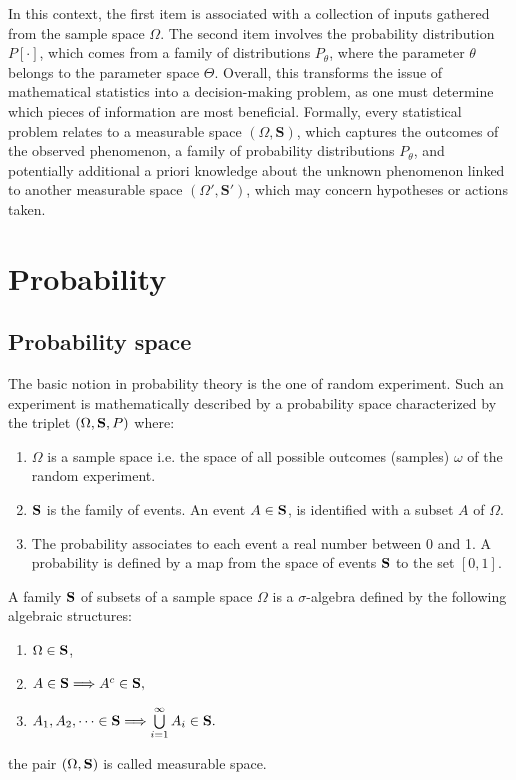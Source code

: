 In this context, the first item is associated with a collection of inputs gathered from the sample space $\Omega$. The second item involves the probability distribution $P[\cdot]$, which comes from a family of distributions ${P_{\theta}}$, where the parameter $\theta$ belongs to the parameter space $\Theta$. 
Overall, this transforms the issue of mathematical statistics into a decision-making problem, as one must determine which pieces of information are most beneficial. Formally, every statistical problem relates to a measurable space $(\Omega, \mathbf{S})$, which captures the outcomes of the observed phenomenon, a family of probability distributions ${P_{\theta}}$, and potentially additional a priori knowledge about the unknown phenomenon linked to another measurable space $(\Omega', \mathbf{S'})$, which may concern hypotheses or actions taken.

\section{Probability }\label{sec:proba}
\subsection{Probability space }
The basic notion in probability theory is the one of random experiment.
Such an experiment is
mathematically described by a probability space characterized by the triplet
$(\Omega,\mathbf{S}, P)$ where:

\begin{enumerate}
\item $\Omega$ is a sample space i.e. the space of all possible outcomes
(samples) $\omega$ of the
random experiment.


\item ${\mathbf{S}}$ is the family of events. An event  $A\in
{\mathbf{S}}$, is identified with a subset $ A$ of $\Omega$. 


 \item The probability associates to each event a real number between 0 and 1. A probability is
defined by a map from the space of events ${\mathbf{S}}$ to the set $[0,1]$.
\end{enumerate}

\begin{definition}
A family ${\mathbf{S}}$ of subsets of a sample space $\Omega$ is a $\sigma$-algebra defined by 
the following algebraic structures:

\begin{enumerate}
\item $\Omega \in {\mathbf{S}}$, 
\item $ A \in {\mathbf{S}}\Longrightarrow A^c \in {\mathbf{S}},$
\item $A_1,A_2,\dots  \in {\mathbf{S}}\Longrightarrow
\bigcup\limits_{i=1}^\infty A_i
\in {\mathbf{S}}.$
\end{enumerate}
the pair $(\Omega,{\mathbf{S}})$ is called measurable space.
\end{definition}

